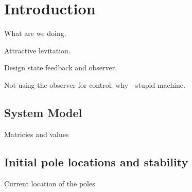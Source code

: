 \section{Introduction}

What are we doing.

Attractive levitation.

Design state feedback and observer.

Not using the observer for control: why - stupid machine.

\subsection{System Model}

Matricies and values

\subsection{Initial pole locations and stability}

Current location of the poles